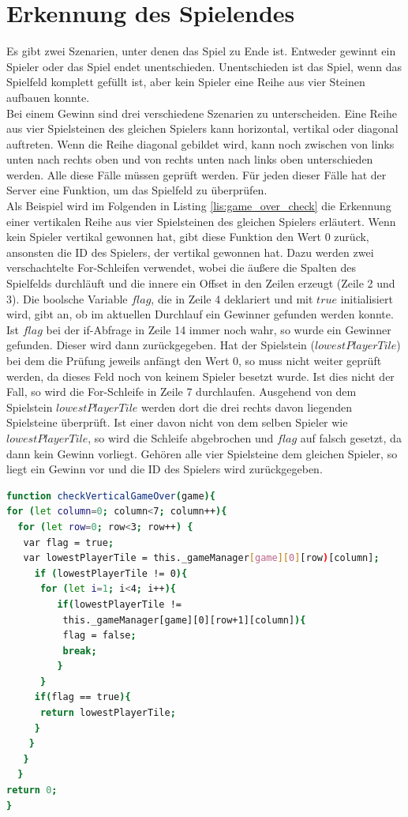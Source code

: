 \section{Erkennung des Spielendes}\label{sec:GameOver}
Es gibt zwei Szenarien, unter denen das Spiel zu Ende ist. Entweder gewinnt ein Spieler oder das Spiel endet unentschieden. Unentschieden ist das Spiel, wenn das Spielfeld komplett gefüllt ist, aber kein Spieler eine Reihe aus vier Steinen aufbauen konnte.\\
Bei einem Gewinn sind drei verschiedene Szenarien zu unterscheiden. Eine Reihe aus vier Spielsteinen des gleichen Spielers kann horizontal, vertikal oder diagonal auftreten. Wenn die Reihe diagonal gebildet wird, kann noch zwischen von links unten nach rechts oben und von rechts unten nach links oben unterschieden werden. Alle diese Fälle müssen geprüft werden. Für jeden dieser Fälle hat der Server eine Funktion, um das Spielfeld zu überprüfen.\\
Als Beispiel wird im Folgenden in Listing \ref{lis:game_over_check} die Erkennung einer vertikalen Reihe aus vier Spielsteinen des gleichen Spielers erläutert. Wenn kein Spieler vertikal gewonnen hat, gibt diese Funktion den Wert $0$ zurück, ansonsten die ID des Spielers, der vertikal gewonnen hat. Dazu werden zwei verschachtelte For-Schleifen verwendet, wobei die äußere die Spalten des Spielfelds durchläuft und die innere ein Offset in den Zeilen erzeugt (Zeile 2 und 3). Die boolsche Variable $flag$, die in Zeile 4 deklariert und mit $true$ initialisiert wird, gibt an, ob im aktuellen Durchlauf ein Gewinner gefunden werden konnte. Ist $flag$ bei der if-Abfrage in Zeile 14 immer noch wahr, so wurde ein Gewinner gefunden. Dieser wird dann zurückgegeben. Hat der Spielstein ($lowestPlayerTile$) bei dem die Prüfung jeweils anfängt den Wert $0$, so muss nicht weiter geprüft werden, da dieses Feld noch von keinem Spieler besetzt wurde. Ist dies nicht der Fall, so wird die For-Schleife in Zeile 7 durchlaufen. Ausgehend von dem Spielstein $lowestPlayerTile$ werden dort die drei rechts davon liegenden Spielsteine überprüft. Ist einer davon nicht von dem selben Spieler wie $lowestPlayerTile$, so wird die Schleife abgebrochen und $flag$ auf falsch gesetzt, da dann kein Gewinn vorliegt. Gehören alle vier Spielsteine dem gleichen Spieler, so liegt ein Gewinn vor und die ID des Spielers wird zurückgegeben.
\begin{lstlisting}[language=bash, caption={Vertikale Game-Over Überprüfung}, label=lis:game_over_check]
function checkVerticalGameOver(game){
for (let column=0; column<7; column++){
  for (let row=0; row<3; row++) {
   var flag = true;
   var lowestPlayerTile = this._gameManager[game][0][row)[column];
     if (lowestPlayerTile != 0){
      for (let i=1; i<4; i++){
	     if(lowestPlayerTile !=
	      this._gameManager[game][0][row+1][column]){
	      flag = false;
	      break;
         }
      }
     if(flag == true){
      return lowestPlayerTile;
     }
    }
   }
  }
return 0;
}
\end{lstlisting}
